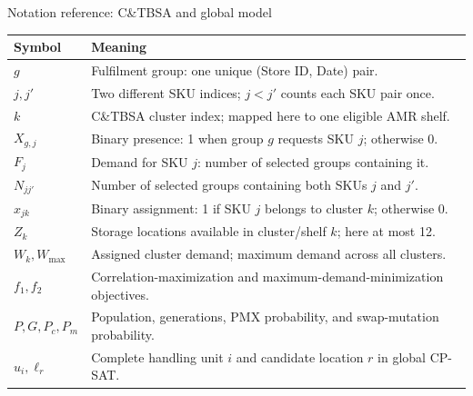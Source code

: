 \documentclass[aspectratio=169,10pt]{beamer}
\begin{document}
\begin{frame}{Notation reference: C\&TBSA and global model}
  \scriptsize
  \begin{tabular}{@{}p{}p{}@{}}
    \toprule
    \textbf{Symbol} & \textbf{Meaning}\\
    \midrule
    $g$ & Fulfilment group: one unique (Store ID, Date) pair.\\
    $j,j'$ & Two different SKU indices; $j<j'$ counts each SKU pair once.\\
    $k$ & C\&TBSA cluster index; mapped here to one eligible AMR shelf.\\
    $X_{g,j}$ & Binary presence: 1 when group $g$ requests SKU $j$; otherwise 0.\\
    $F_j$ & Demand for SKU $j$: number of selected groups containing it.\\
    $N_{jj'}$ & Number of selected groups containing both SKUs $j$ and $j'$.\\
    $x_{jk}$ & Binary assignment: 1 if SKU $j$ belongs to cluster $k$; otherwise 0.\\
    $Z_k$ & Storage locations available in cluster/shelf $k$; here at most 12.\\
    $W_k,W_{\max}$ & Assigned cluster demand; maximum demand across all clusters.\\
    $f_1,f_2$ & Correlation-maximization and maximum-demand-minimization objectives.\\
    $P,G,P_c,P_m$ & Population, generations, PMX probability, and swap-mutation probability.\\
    $u_i,\ell_r$ & Complete handling unit $i$ and candidate location $r$ in global CP-SAT.\\
    \bottomrule
  \end{tabular}
\end{frame}
\end{document}
